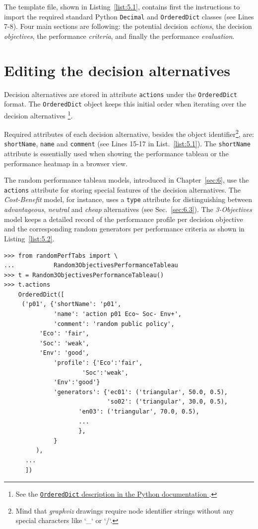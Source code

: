 The template file, shown in Listing~\vref{list:5.1}, contains first the instructions to import the required standard Python \texttt{Decimal} and \texttt{OrderedDict} classes (see Lines 7-8). Four main sections are following: the potential decision \emph{actions}, the decision \emph{objectives}, the performance \emph{criteria}, and finally the performance \emph{evaluation}.  

\section{Editing the decision alternatives}
\label{sec:5.2}

Decision alternatives are stored in attribute \texttt{actions} under the \texttt{OrderedDict} format. The \texttt{OrderedDict} object keeps this initial order when iterating over the decision alternatives \footnote{See the \href{https://docs.python.org/3/library/collections.html}{\texttt{OrderedDict} description in the Python documentation \citep{python}}.}.

Required attributes of each decision alternative, besides the object identifier\footnote{Mind that \emph{graphviz} drawings require node identifier strings without any special characters like `\_` or `/`.},  are: \texttt{shortName}, \texttt{name} and \texttt{comment} (see Lines 15-17 in List.~\vref{list:5.1}). The \texttt{shortName} attribute is essentially used when showing the performance tableau or the performance heatmap in a browser view.

The random performance tableau models, introduced in Chapter~\ref{sec:6}, use the \texttt{actions} attribute for storing special features of the decision alternatives. The \emph{Cost-Benefit} model, for instance, uses a \texttt{type} attribute for distinguishing between \emph{advantageous}, \emph{neutral} and \emph{cheap} alternatives (see Sec.~\ref{sec:6.3}). The \emph{3-Objectives} model keeps a detailed record of the performance profile per decision objective and the corresponding random generators per performance criteria as shown in Listing~\vref{list:5.2}.
\begin{lstlisting}[caption={Example of decision alternative description},label=list:5.2]
>>> from randomPerfTabs import \
...           Random3ObjectivesPerformanceTableau
>>> t = Random3ObjectivesPerformanceTableau()
>>> t.actions
    OrderedDict([
     ('p01', {'shortName': 'p01',
              'name': 'action p01 Eco~ Soc- Env+',
              'comment': 'random public policy',
	      'Eco': 'fair',
	      'Soc': 'weak',
	      'Env': 'good',
              'profile': {'Eco':'fair',
	                  'Soc':'weak',
			  'Env':'good'}
              'generators': {'ec01': ('triangular', 50.0, 0.5),
                             'so02': ('triangular', 30.0, 0.5),
		             'en03': ('triangular', 70.0, 0.5),
		             ...
		             },
              }
         ),
      ...
      ])
\end{lstlisting}

